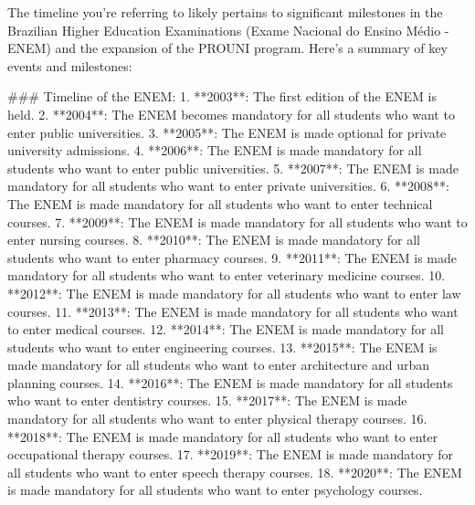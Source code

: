 The timeline you're referring to likely pertains to significant milestones in the Brazilian Higher Education Examinations (Exame Nacional do Ensino Médio - ENEM) and the expansion of the PROUNI program. Here's a summary of key events and milestones:

### Timeline of the ENEM:
1. **2003**: The first edition of the ENEM is held.
2. **2004**: The ENEM becomes mandatory for all students who want to enter public universities.
3. **2005**: The ENEM is made optional for private university admissions.
4. **2006**: The ENEM is made mandatory for all students who want to enter public universities.
5. **2007**: The ENEM is made mandatory for all students who want to enter private universities.
6. **2008**: The ENEM is made mandatory for all students who want to enter technical courses.
7. **2009**: The ENEM is made mandatory for all students who want to enter nursing courses.
8. **2010**: The ENEM is made mandatory for all students who want to enter pharmacy courses.
9. **2011**: The ENEM is made mandatory for all students who want to enter veterinary medicine courses.
10. **2012**: The ENEM is made mandatory for all students who want to enter law courses.
11. **2013**: The ENEM is made mandatory for all students who want to enter medical courses.
12. **2014**: The ENEM is made mandatory for all students who want to enter engineering courses.
13. **2015**: The ENEM is made mandatory for all students who want to enter architecture and urban planning courses.
14. **2016**: The ENEM is made mandatory for all students who want to enter dentistry courses.
15. **2017**: The ENEM is made mandatory for all students who want to enter physical therapy courses.
16. **2018**: The ENEM is made mandatory for all students who want to enter occupational therapy courses.
17. **2019**: The ENEM is made mandatory for all students who want to enter speech therapy courses.
18. **2020**: The ENEM is made mandatory for all students who want to enter psychology courses.

